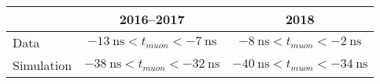 \begin{table}
\noindent \centering{}
\label{arrival_time_requirements}
\begin{tabular}{l|cc}
\hline
           & 2016--2017                   & 2018\\
\hline
Data       & $\SI{-13}{\ns} < t_{muon} <  \SI{-7}{\ns}$ &  $\SI{-8}{\ns} < t_{muon} <  \SI{-2}{\ns}$\\
Simulation & $\SI{-38}{\ns} < t_{muon} < \SI{-32}{\ns}$ & $\SI{-40}{\ns} < t_{muon} < \SI{-34}{\ns}$\\
\hline
\end{tabular}
\end{table}